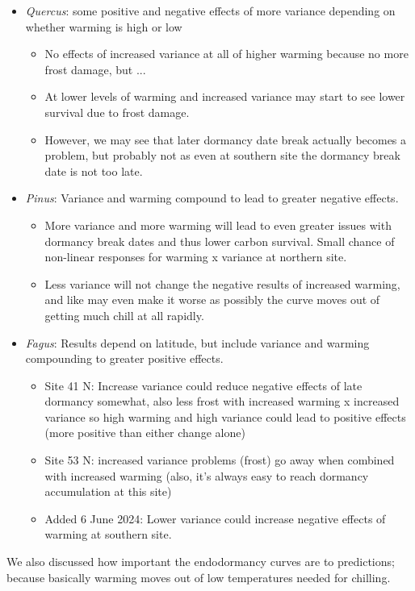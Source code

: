 \documentclass[11pt,letter]{article}
\begin{document}
\begin{itemize}
\item \emph{Quercus}: some positive and negative effects of more variance depending on whether warming is high or low
\begin{itemize}
\item No effects of increased variance at all of higher warming because no more frost damage, but ...
\item At lower levels of warming and increased variance may start to see lower survival due to frost damage. 
\item However, we may see that later dormancy date break actually becomes a problem, but probably not as even at southern site the dormancy break date is not too late.
\end{itemize}
\item \emph{Pinus}: Variance and warming compound to lead to greater negative effects. 
\begin{itemize}
\item More variance and more warming will lead to even greater issues with dormancy break dates and thus lower carbon survival. Small chance of non-linear responses for warming x variance at northern site.
\item Less variance will not change the negative results of increased warming, and like may even make it worse as possibly the curve moves out of getting much chill at all rapidly. 
\end{itemize}
\item \emph{Fagus}: Results depend on latitude, but include variance and warming compounding to greater positive effects. 
\begin{itemize}
\item Site 41 N: Increase variance could reduce negative effects of late dormancy somewhat, also less frost with increased warming x increased variance so high warming and high variance could lead to positive effects (more positive than either change alone)
\item Site 53 N: increased variance problems (frost) go away when combined with increased warming (also, it's always easy to reach dormancy accumulation at this site)
\item Added 6 June 2024: Lower variance could increase negative effects of warming at southern site. 
\end{itemize}
\end{itemize}

We also discussed how important the endodormancy curves are to predictions; because basically warming moves out of low temperatures needed for chilling.
\end{document}
